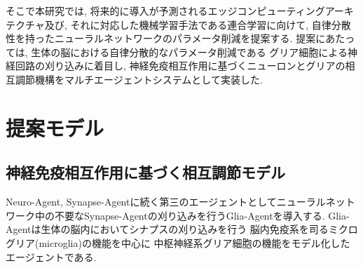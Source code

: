 \documentclass[a4paper,10.5pt,twocolumn]{jsarticle}
\begin{document}
そこで本研究では, 将来的に導入が予測されるエッジコンピューティングアーキテクチャ及び, 
それに対応した機械学習手法である連合学習に向けて, 
自律分散性を持ったニューラルネットワークのパラメータ削減を提案する.
提案にあたっては, 生体の脳における自律分散的なパラメータ削減である
グリア細胞による神経回路の刈り込みに着目し, 
神経免疫相互作用に基づくニューロンとグリアの相互調節機構をマルチエージェントシステムとして実装した.
\section{提案モデル}

\subsection{神経免疫相互作用に基づく相互調節モデル}
Neuro-Agent, Synapse-Agentに続く第三のエージェントとしてニューラルネットワーク中の不要なSynapse-Agentの刈り込みを行うGlia-Agentを導入する. 
Glia-Agentは生体の脳内においてシナプスの刈り込みを行う
脳内免疫系を司るミクログリア(microglia)の機能を中心に
中枢神経系グリア細胞の機能をモデル化したエージェントである.
\end{document}
